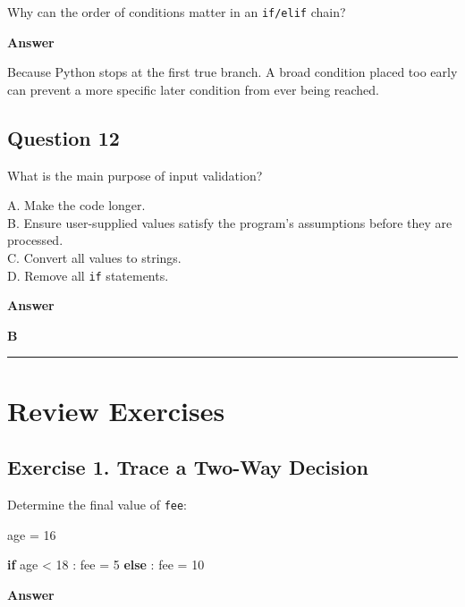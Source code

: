 \documentclass[
  11pt,
  a4paper,
]{article}
\newenvironment{Shaded}{}{}
\newcommand{\ControlFlowTok}[1]{\textcolor[rgb]{0.00,0.44,0.13}{\textbf{#1}}}
\newcommand{\DecValTok}[1]{\textcolor[rgb]{0.25,0.63,0.44}{#1}}
\newcommand{\NormalTok}[1]{#1}
\newcommand{\OperatorTok}[1]{\textcolor[rgb]{0.40,0.40,0.40}{#1}}
\begin{document}
Why can the order of conditions matter in an \texttt{if/elif} chain?

\textbf{Answer}

Because Python stops at the first true branch. A broad condition placed
too early can prevent a more specific later condition from ever being
reached.

\subsection{Question 12}\label{question-12}

What is the main purpose of input validation?

A. Make the code longer.\\
B. Ensure user-supplied values satisfy the program's assumptions before
they are processed.\\
C. Convert all values to strings.\\
D. Remove all \texttt{if} statements.

\textbf{Answer}

\textbf{B}

\begin{center}\rule{0.5\linewidth}{0.5pt}\end{center}

\section{Review Exercises}\label{review-exercises}

\subsection{Exercise 1. Trace a Two-Way
Decision}\label{exercise-1.-trace-a-two-way-decision}

Determine the final value of \texttt{fee}:

\begin{Shaded}
\begin{Highlighting}[]
\NormalTok{age }\OperatorTok{=} \DecValTok{16}

\ControlFlowTok{if}\NormalTok{ age }\OperatorTok{\textless{}} \DecValTok{18}\NormalTok{ :}
\NormalTok{    fee }\OperatorTok{=} \DecValTok{5}
\ControlFlowTok{else}\NormalTok{ :}
\NormalTok{    fee }\OperatorTok{=} \DecValTok{10}
\end{Highlighting}
\end{Shaded}

\textbf{Answer}
\end{document}

